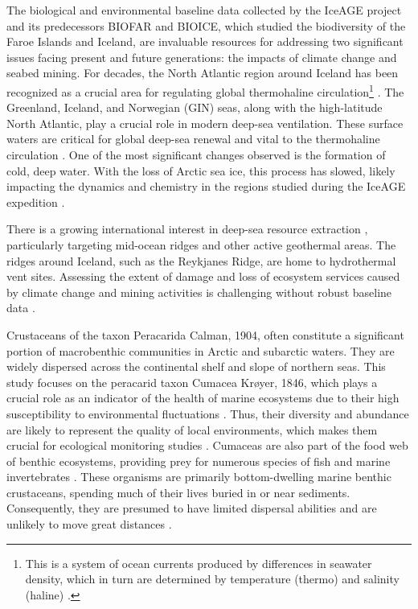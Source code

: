 The biological and environmental baseline data collected by the IceAGE project and its predecessors BIOFAR and BIOICE, which studied the biodiversity of the Faroe Islands and Iceland, are invaluable resources for addressing two significant issues facing present and future generations: the impacts of climate change and seabed mining. For decades, the North Atlantic region around Iceland has been recognized as a crucial area for regulating global {thermohaline circulation}\footnote{This is a system of ocean currents produced by differences in seawater density, which in turn are determined by temperature (thermo) and salinity (haline) \citep{talley2013closure}.} \citep{meisner_prefacebiodiversity_2018}. The Greenland, Iceland, and Norwegian (GIN) seas, along with the high-latitude North Atlantic, play a crucial role in modern deep-sea ventilation. These surface waters are critical for global deep-sea renewal and vital to the thermohaline circulation \citep{johannessen_relationship_1994}. One of the most significant changes observed is the formation of cold, deep water. With the loss of Arctic sea ice, this process has slowed, likely impacting the dynamics and chemistry in the regions studied during the IceAGE expedition \citep{meisner_prefacebiodiversity_2018}.

There is a growing international interest in deep-sea resource extraction \citep{mengerink_call_2014}, particularly targeting mid-ocean ridges and other active geothermal areas. The ridges around Iceland, such as the Reykjanes Ridge, are home to hydrothermal vent sites. Assessing the extent of damage and loss of ecosystem services caused by climate change and mining activities is challenging without robust baseline data \citep{meisner_prefacebiodiversity_2018}.

Crustaceans of the taxon Peracarida Calman, 1904, often constitute a significant portion of macrobenthic communities in Arctic and subarctic waters. They are widely dispersed across the continental shelf and slope of northern seas. This study focuses on the peracarid taxon Cumacea Krøyer, 1846, which plays a crucial role as an indicator of the health of marine ecosystems due to their high susceptibility to environmental fluctuations \citep{stransky_diversity_2010}. Thus, their diversity and abundance are likely to represent the quality of local environments, which makes them crucial for ecological monitoring studies \citep{hessler1967faunal}. Cumaceas are also part of the food web of benthic ecosystems, providing prey for numerous species of fish and marine invertebrates \citep{rehm2009cumacea}. These organisms are primarily bottom-dwelling marine benthic crustaceans, spending much of their lives buried in or near sediments. Consequently, they are presumed to have limited dispersal abilities and are unlikely to move great distances \citep{uhlir_adding_2021}.

